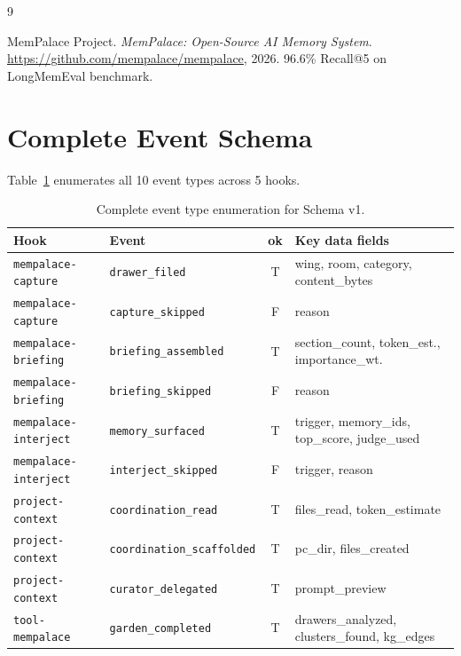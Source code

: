 \documentclass[11pt]{article}
\begin{document}
\begin{thebibliography}{9}

MemPalace Project.
\textit{MemPalace: Open-Source AI Memory System}.
\url{https://github.com/mempalace/mempalace}, 2026.
96.6\% Recall@5 on LongMemEval benchmark.

\end{thebibliography}

\appendix

\section{Complete Event Schema}
\label{app:events}

Table~\ref{tab:events-full} enumerates all 10 event types across 5 hooks.

\begin{table}[H]
\centering
\caption{Complete event type enumeration for Schema v1.}
\label{tab:events-full}
\footnotesize
\begin{tabular}{@{}llcl@{}}
\toprule
\textbf{Hook} & \textbf{Event} & \textbf{ok} & \textbf{Key data fields} \\
\midrule
\texttt{mempalace-capture}   & \texttt{drawer\_filed}         & T & wing, room, category, content\_bytes \\
\texttt{mempalace-capture}   & \texttt{capture\_skipped}      & F & reason \\
\midrule
\texttt{mempalace-briefing}  & \texttt{briefing\_assembled}   & T & section\_count, token\_est., importance\_wt. \\
\texttt{mempalace-briefing}  & \texttt{briefing\_skipped}     & F & reason \\
\midrule
\texttt{mempalace-interject} & \texttt{memory\_surfaced}      & T & trigger, memory\_ids, top\_score, judge\_used \\
\texttt{mempalace-interject} & \texttt{interject\_skipped}    & F & trigger, reason \\
\midrule
\texttt{project-context}     & \texttt{coordination\_read}    & T & files\_read, token\_estimate \\
\texttt{project-context}     & \texttt{coordination\_scaffolded} & T & pc\_dir, files\_created \\
\texttt{project-context}     & \texttt{curator\_delegated}    & T & prompt\_preview \\
\midrule
\texttt{tool-mempalace}      & \texttt{garden\_completed}     & T & drawers\_analyzed, clusters\_found, kg\_edges \\
\bottomrule
\end{tabular}
\end{table}
\end{document}
